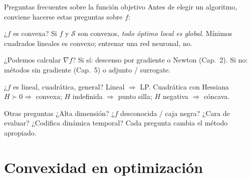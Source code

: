 \documentclass[10pt,aspectratio=169]{beamer}
\theoremstyle{definition}
\theoremstyle{plain}
\begin{document}
\begin{frame}[t]{Preguntas frecuentes sobre la función objetivo}
  Antes de elegir un algoritmo, conviene hacerse estas preguntas sobre $f$:

  \begin{block}{¿$f$ es convexa?}
    Si $f$ y $\mathcal{S}$ son convexos, \emph{todo óptimo local es global}.
    Mínimos cuadrados lineales es convexo; entrenar una red neuronal, no.
  \end{block}

  \begin{block}{¿Podemos calcular $\nabla f$?}
    Si sí: descenso por gradiente o Newton (Cap.~2).
    Si no: métodos sin gradiente (Cap.~5) o adjunto / surrogate.
  \end{block}

  \begin{block}{¿$f$ es lineal, cuadrática, general?}
    Lineal $\Rightarrow$ LP. Cuadrática con Hessiana $H\succ 0 \Rightarrow$ convexa;
    $H$ indefinida $\Rightarrow$ punto silla; $H$ negativa $\Rightarrow$ cóncava.
  \end{block}

  \begin{block}{Otras preguntas}
    ¿Alta dimensión? ¿$f$ desconocida / caja negra? ¿Cara de evaluar?
    ¿Codifica dinámica temporal? Cada pregunta cambia el método apropiado.
  \end{block}
\end{frame}

\section{Convexidad en optimización}
\end{document}
